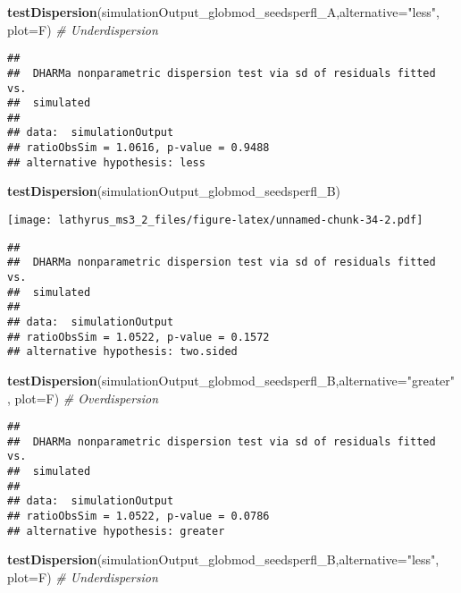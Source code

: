 \documentclass[
]{article}
\newenvironment{Shaded}{\begin{snugshade}}{\end{snugshade}}
\newcommand{\CommentTok}[1]{\textcolor[rgb]{0.56,0.35,0.01}{\textit{#1}}}
\newcommand{\DataTypeTok}[1]{\textcolor[rgb]{0.13,0.29,0.53}{#1}}
\newcommand{\KeywordTok}[1]{\textcolor[rgb]{0.13,0.29,0.53}{\textbf{#1}}}
\newcommand{\NormalTok}[1]{#1}
\newcommand{\StringTok}[1]{\textcolor[rgb]{0.31,0.60,0.02}{#1}}
\begin{document}
\begin{Shaded}
\begin{Highlighting}[]
\KeywordTok{testDispersion}\NormalTok{(simulationOutput_globmod_seedsperfl_A,}\DataTypeTok{alternative=}\StringTok{"less"}\NormalTok{,}
               \DataTypeTok{plot=}\NormalTok{F) }\CommentTok{# Underdispersion}
\end{Highlighting}
\end{Shaded}

\begin{verbatim}
## 
##  DHARMa nonparametric dispersion test via sd of residuals fitted vs.
##  simulated
## 
## data:  simulationOutput
## ratioObsSim = 1.0616, p-value = 0.9488
## alternative hypothesis: less
\end{verbatim}

\begin{Shaded}
\begin{Highlighting}[]
\KeywordTok{testDispersion}\NormalTok{(simulationOutput_globmod_seedsperfl_B)}
\end{Highlighting}
\end{Shaded}

\texttt{[image: lathyrus\_ms3\_2\_files/figure-latex/unnamed-chunk-34-2.pdf]}

\begin{verbatim}
## 
##  DHARMa nonparametric dispersion test via sd of residuals fitted vs.
##  simulated
## 
## data:  simulationOutput
## ratioObsSim = 1.0522, p-value = 0.1572
## alternative hypothesis: two.sided
\end{verbatim}

\begin{Shaded}
\begin{Highlighting}[]
\KeywordTok{testDispersion}\NormalTok{(simulationOutput_globmod_seedsperfl_B,}\DataTypeTok{alternative=}\StringTok{"greater"}\NormalTok{,}
               \DataTypeTok{plot=}\NormalTok{F) }\CommentTok{# Overdispersion}
\end{Highlighting}
\end{Shaded}

\begin{verbatim}
## 
##  DHARMa nonparametric dispersion test via sd of residuals fitted vs.
##  simulated
## 
## data:  simulationOutput
## ratioObsSim = 1.0522, p-value = 0.0786
## alternative hypothesis: greater
\end{verbatim}

\begin{Shaded}
\begin{Highlighting}[]
\KeywordTok{testDispersion}\NormalTok{(simulationOutput_globmod_seedsperfl_B,}\DataTypeTok{alternative=}\StringTok{"less"}\NormalTok{,}
               \DataTypeTok{plot=}\NormalTok{F) }\CommentTok{# Underdispersion}
\end{Highlighting}
\end{Shaded}
\end{document}

